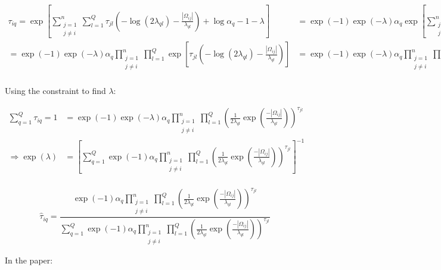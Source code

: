 \documentclass[10pt]{article}
\begin{document}
\begin{align*}
\tau_{iq} = \exp \left[ \sum_{\substack{j = 1 \\  j\neq i}}^n \sum_{l = 1}^Q \tau_{jl}\left( -\log (2\lambda_{ql}) - \frac{|\Omega_{ij}|}{\lambda_{ql}}\right)  +  \log \alpha_q  - 1 - \lambda \right] 
	 & = \exp(-1) \exp(-\lambda) \alpha_q \exp \left[  \sum_{\substack{j = 1 \\  j\neq i}}^n \sum_{l = 1}^Q \tau_{jl}\left( -\log (2\lambda_{ql}) - \frac{|\Omega_{ij}|}{\lambda_{ql}}\right)\right] \\
	= \exp(-1)\exp(-\lambda)\alpha_q \prod_{\substack{j = 1 \\  j\neq i}}^n \prod_{l = 1}^Q \exp \left[\tau_{jl} \left(-\log (2\lambda_{ql}) - \frac{|\Omega_{ij}|}{\lambda_{ql}}\right)\right] 
	&= \exp(-1)\exp(-\lambda)\alpha_q \prod_{\substack{j = 1 \\  j\neq i}}^n \prod_{l = 1}^Q \left( \frac{1}{2\lambda_{ql}} \exp\left(\frac{-|\Omega_{ij}|}{\lambda_{ql}} \right) \right)^{\tau_{jl}} \\
\end{align*}

Using the constraint to find $\lambda$: 

\begin{align*}
\sum_{q=1}^Q \tau_{iq} = 1 &= \exp(-1)\exp(-\lambda)\alpha_q \prod_{\substack{j = 1 \\  j\neq i}}^n \prod_{l = 1}^Q \left( \frac{1}{2\lambda_{ql}} \exp\left(\frac{-|\Omega_{ij}|}{\lambda_{ql}} \right) \right)^{\tau_{jl}} \\
\Rightarrow \exp(\lambda) &= \left[ \sum_{q=1}^Q  \exp(-1)\alpha_q \prod_{\substack{j = 1 \\  j\neq i}}^n \prod_{l = 1}^Q \left( \frac{1}{2\lambda_{ql}} \exp\left(\frac{-|\Omega_{ij}|}{\lambda_{ql}} \right) \right)^{\tau_{jl}}\right]^{-1} \\
\end{align*}

\[\boxed{\hat{\tau}_{iq} = \frac{\exp(-1) \alpha_q \prod_{\substack{j = 1 \\  j\neq i}}^n \prod_{l = 1}^Q \left( \frac{1}{2\lambda_{ql}} \exp\left(\frac{-|\Omega_{ij}|}{\lambda_{ql}} \right) \right)^{\tau_{jl}}}{\sum_{q=1}^Q  \exp(-1)\alpha_q \prod_{\substack{j = 1 \\  j\neq i}}^n \prod_{l = 1}^Q \left( \frac{1}{2\lambda_{ql}} \exp\left(\frac{-|\Omega_{ij}|}{\lambda_{ql}} \right) \right)^{\tau_{jl}}}} \]

In the paper: 
\end{document}

